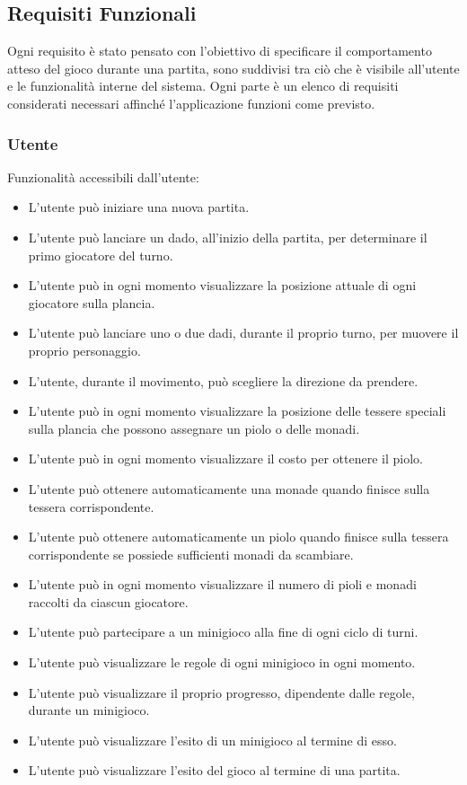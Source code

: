 \subsection{Requisiti Funzionali} \label{sec:functional-requirements}
Ogni requisito è stato pensato con l'obiettivo di specificare il comportamento atteso
del gioco durante una partita, sono suddivisi tra ciò che è visibile all'utente e
le funzionalità interne del sistema. Ogni parte è un elenco di requisiti considerati
necessari affinché l'applicazione funzioni come previsto.

\subsubsection{Utente} \label{sec:functional-requirements:user}
Funzionalità accessibili dall'utente:
\begin{itemize}
      \item L'utente può iniziare una nuova partita.
      \item L'utente può lanciare un dado, all'inizio della partita, per determinare il 
            primo giocatore del turno.
      \item L'utente può in ogni momento visualizzare la posizione attuale di ogni giocatore
            sulla plancia.
      \item L'utente può lanciare uno o due dadi, durante il proprio turno, per muovere il proprio
            personaggio.
      \item L'utente, durante il movimento, può scegliere la direzione da prendere.
      \item L'utente può in ogni momento visualizzare la posizione delle tessere speciali sulla
            plancia che possono assegnare un piolo o delle monadi.
      \item L'utente può in ogni momento visualizzare il costo per ottenere il piolo.
      \item L'utente può ottenere automaticamente una monade quando finisce sulla tessera 
            corrispondente.
      \item L'utente può ottenere automaticamente un piolo quando finisce sulla tessera 
            corrispondente se possiede sufficienti monadi da scambiare.
      \item L'utente può in ogni momento visualizzare il numero di pioli e monadi raccolti 
            da ciascun giocatore.
      \item L'utente può partecipare a un minigioco alla fine di ogni ciclo di turni.
      \item L'utente può visualizzare le regole di ogni minigioco in ogni momento.
      \item L'utente può visualizzare il proprio progresso, dipendente dalle regole, durante
            un minigioco.
      \item L'utente può visualizzare l'esito di un minigioco al termine di esso.
      \item L'utente può visualizzare l'esito del gioco al termine di una partita.
\end{itemize}

